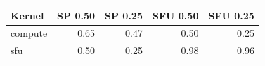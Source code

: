 \begin{tabular}{lrrrr}
\toprule
Kernel & SP 0.50 & SP 0.25 & SFU 0.50 & SFU 0.25 \\
\midrule
compute & 0.65 & 0.47 & 0.50 & 0.25 \\
sfu & 0.50 & 0.25 & 0.98 & 0.96 \\
\bottomrule
\end{tabular}

